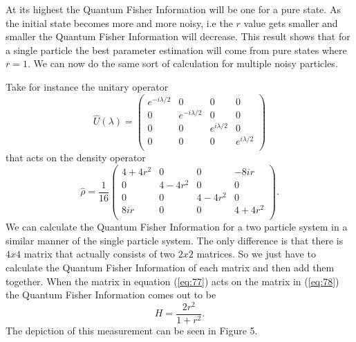 \documentclass[twocolumn]{article}
\begin{document}
At its highest the Quantum Fisher Information will be one for a pure state. As the initial state becomes more and more noisy, i.e the $r$ value gets smaller and smaller the Quantum Fisher Information will decrease. This result shows that for a single particle the best parameter estimation will come from pure states where $r=1$. We can now do the same sort of calculation for multiple noisy particles. 

Take for instance the unitary operator
\begin{equation} \label{eq:77}
\hat{U}(\lambda)=
\left(\begin{array}{cccc}
e^{-i\lambda/2} & 0 & 0 & 0 \\
0 & e^{-i\lambda/2} & 0 & 0 \\
0 & 0 & e^{i\lambda/2} & 0 \\
0 & 0 & 0 & e^{i\lambda/2} \\
\end{array}\right)
\end{equation}
that acts on the density operator
\begin{equation} \label{eq:78}
\hat{\rho}=\frac{1}{16}
\left(\begin{array}{cccc}
4+4r^2 & 0 & 0 & -8ir \\
0 & 4-4r^2 & 0 & 0 \\
0 & 0 & 4-4r^2 & 0 \\
8ir & 0 & 0 & 4+4r^2 \\
\end{array}\right).
\end{equation}
We can calculate the Quantum Fisher Information for a two particle system in a similar manner of the single particle system. The only difference is that there is $4x4$ matrix that actually consists of two $2x2$ matrices. So we just have to calculate the Quantum Fisher Information of each matrix and then add them together. When the matrix in equation (\ref{eq:77}) acts on the matrix in (\ref{eq:78}) the Quantum Fisher Information comes out to be
\begin{equation} \label{eq:79}
H=\frac{2r^2}{1+r^2}.
\end{equation}
The depiction of this measurement can be seen in Figure 5.
\end{document}
